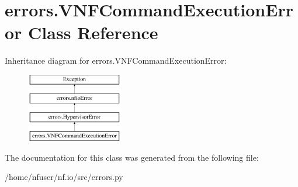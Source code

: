\hypertarget{classerrors_1_1VNFCommandExecutionError}{\section{errors.\-V\-N\-F\-Command\-Execution\-Error Class Reference}
\label{classerrors_1_1VNFCommandExecutionError}
}
Inheritance diagram for errors.\-V\-N\-F\-Command\-Execution\-Error\-:\begin{figure}[H]
\begin{center}
\leavevmode
\includegraphics[height=3.000000cm]{classerrors_1_1VNFCommandExecutionError}
\end{center}
\end{figure}


The documentation for this class was generated from the following file\-:\begin{DoxyCompactItemize}
\item 
/home/nfuser/nf.\-io/src/errors.\-py\end{DoxyCompactItemize}
